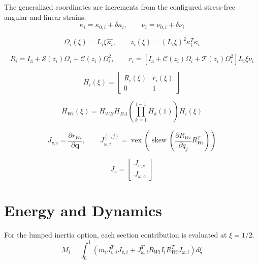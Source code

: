 \documentclass[11pt]{article}
\newcommand{\Sfun}{\mathcal{S}}
\newcommand{\Cfun}{\mathcal{C}}
\newcommand{\Tfun}{\mathcal{T}}
\begin{document}
The generalized coordinates are increments from the configured stress-free angular and linear strains.
\begin{equation}
\kappa_i=\kappa_{0,i}+\delta\kappa_i,\qquad \nu_i=\nu_{0,i}+\delta\nu_i
\end{equation}

\begin{equation}
\Omega_i(\xi)=L_i\xi\widehat{\kappa_i},\qquad z_i(\xi)=(L_i\xi)^2\kappa_i^T\kappa_i
\end{equation}

\begin{equation}
R_i=I_3+\Sfun(z_i)\Omega_i+\Cfun(z_i)\Omega_i^2,\qquad r_i=\left[I_3+\Cfun(z_i)\Omega_i+\Tfun(z_i)\Omega_i^2\right]L_i\xi\nu_i
\end{equation}

\begin{equation}
H_i(\xi)=\begin{bmatrix}R_i(\xi)&r_i(\xi)\\0&1\end{bmatrix}\label{eq:local-transform}
\end{equation}

\begin{equation}
H_{Wi}(\xi)=H_{WB}H_{BA}\left(\prod_{k=1}^{i-1}H_k(1)\right)H_i(\xi)
\end{equation}

\begin{equation}
J_{v,i}=\frac{\partial r_{Wi}}{\partial\boldsymbol q},\qquad J_{\omega,i}^{(:,j)}=\operatorname{vex}\!\left(\operatorname{skew}\!\left(\frac{\partial R_{Wi}}{\partial q_j}R_{Wi}^{T}\right)\right)
\end{equation}

\begin{equation}
J_e=\begin{bmatrix}J_{v,e}\\J_{\omega,e}\end{bmatrix}
\end{equation}


\section{Energy and Dynamics}
For the lumped inertia option, each section contribution is evaluated at $\xi=1/2$.
\begin{equation}
M_i=\int_0^1\!\left(m_iJ_{v,i}^{T}J_{v,i}+J_{\omega,i}^{T}R_{Wi}I_iR_{Wi}^{T}J_{\omega,i}\right)d\xi
\end{equation}
\end{document}
